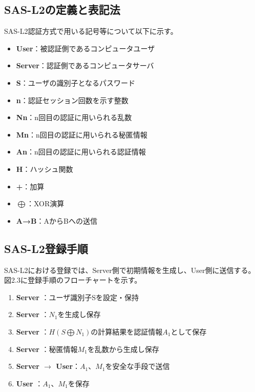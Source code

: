 \documentclass{thesis}
\begin{document}
\subsection{SAS-L2の定義と表記法}
SAS-L2認証方式で用いる記号等について以下に示す。

\begin{itemize}
\item \textbf{User}：被認証側であるコンピュータユーザ
\item \textbf{Server}：認証側であるコンピュータサーバ
\item \textbf{S}：ユーザの識別子となるパスワード
\item \textbf{n}：認証セッション回数を示す整数
\item \textbf{Nn}：n回目の認証に用いられる乱数
\item \textbf{Mn}：n回目の認証に用いられる秘匿情報
\item \textbf{An}：n回目の認証に用いられる認証情報
\item \textbf{H}：ハッシュ関数
\item \textbf{+}：加算
\item \textbf{$\bigoplus$}：XOR演算
\item \textbf{A→B}：AからBへの送信
\end{itemize}

\subsection{SAS-L2登録手順}
SAS-L2における登録では、Server側で初期情報を生成し、User側に送信する。図2.3に登録手順のフローチャートを示す。

\begin{enumerate}
\item \textbf{Server} \hspace{41pt}：ユーザ識別子Sを設定・保持
\item \textbf{Server} \hspace{41pt}：$N_1$を生成し保存
\item \textbf{Server} \hspace{41pt}：$H(S \bigoplus N_1)$の計算結果を認証情報$A_1$として保存
\item \textbf{Server} \hspace{41pt}：秘匿情報$M_1$を乱数から生成し保存
\item \textbf{Server $\rightarrow$ User}：$A_1、M_1$を安全な手段で送信
\item \textbf{User} \hspace{52pt}：$A_1、M_1$を保存
\end{enumerate}
\end{document}
